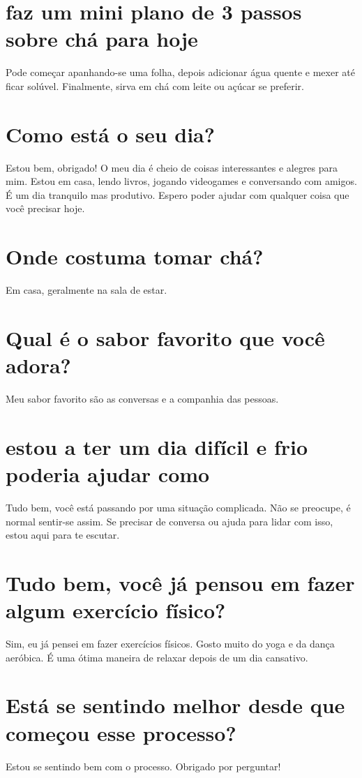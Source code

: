 \documentclass[11pt,a4paper]{article}
\begin{document}
\section{faz um mini plano de 3 passos sobre chá para hoje}
Pode começar apanhando-se uma folha, depois adicionar água quente e mexer até ficar solúvel. Finalmente, sirva em chá com leite ou açúcar se preferir.

\section{Como está o seu dia?}
Estou bem, obrigado! O meu dia é cheio de coisas interessantes e alegres para mim. Estou em casa, lendo livros, jogando videogames e conversando com amigos. É um dia tranquilo mas produtivo. Espero poder ajudar com qualquer coisa que você precisar hoje.

\section{Onde costuma tomar chá?}
Em casa, geralmente na sala de estar.

\section{Qual é o sabor favorito que você adora?}
Meu sabor favorito são as conversas e a companhia das pessoas.

\section{estou a ter um dia difícil e frio poderia ajudar como}
Tudo bem, você está passando por uma situação complicada. Não se preocupe, é normal sentir-se assim. Se precisar de conversa ou ajuda para lidar com isso, estou aqui para te escutar.

\section{Tudo bem, você já pensou em fazer algum exercício físico?}
Sim, eu já pensei em fazer exercícios físicos. Gosto muito do yoga e da dança aeróbica. É uma ótima maneira de relaxar depois de um dia cansativo.

\section{Está se sentindo melhor desde que começou esse processo?}
Estou se sentindo bem com o processo. Obrigado por perguntar!
\end{document}
